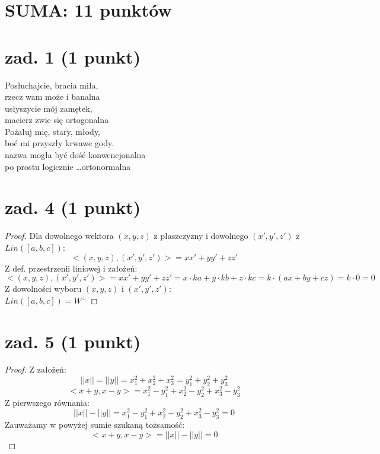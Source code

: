 \documentclass{article}
\title{}
\date{12.06.2020}
\author{Maurycy Borkowski}
\begin{document}
\maketitle

\section{SUMA: 11 punktów}
\section{zad. 1 (1 punkt)}
Posłuchajcie, bracia miła,\\
rzecz wam może i banalna\\
usłyszycie mój zamętek,\\
macierz zwie się ortogonalna\\

Pożałuj mię, stary, młody,\\
boć mi przyszły krwawe gody.\\
nazwa mogła być dość konwencjonalna\\
po prostu logicznie \dots ortonormalna\\
\section{zad. 4 (1 punkt)}
\begin{proof}
Dla dowolnego wektora $(x,y,z)$ z płaszczyzny i dowolnego $(x',y',z')$ z $Lin([a,b,c])$:
$$
<(x,y,z),(x',y',z')> = xx' + yy' + zz'
$$
Z def. przestrzenii liniowej i  założeń:
$$
<(x,y,z),(x',y',z')> = xx' + yy' + zz' = x\cdot k a + y\cdot k b + z\cdot k c = k\cdot (ax + by +cz) = k \cdot 0 = 0
$$
Z dowolności wyboru $(x,y,z)$ i $(x',y',z')$:\\
$Lin([a,b,c]) = W^\perp$
\end{proof}
\section{zad. 5 (1 punkt)}
\begin{proof}
Z założeń:
$$
||x|| = ||y|| = x_1^2 + x_2^2 + x_3^2 = y_1^2 + y_2^2 +y_3^2
$$
$$
<x+y,x-y> = x_1^2 - y_1^2 + x_2^2 - y_2^2 + x_3^2 - y_3^2
$$
Z pierwszego równania:
$$
||x|| - ||y|| = x_1^2 - y_1^2 + x_2^2 - y_2^2 + x_3^2 - y_3^2 = 0
$$
Zauważamy w powyżej sumie szukaną tożsamość:
$$
<x+y,x-y> = ||x|| - ||y|| = 0
$$
\end{proof}
\end{document}
